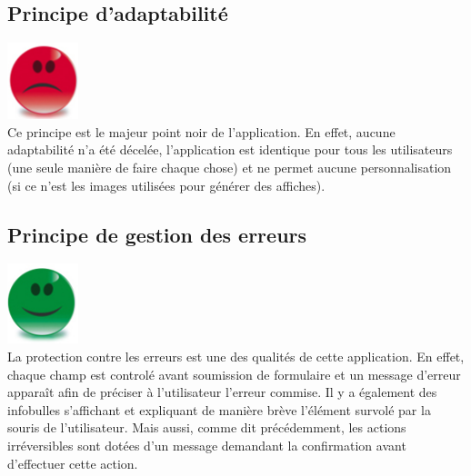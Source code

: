 \documentclass{article}
\begin{document}
\begin{sffamily}
\subsection{Principe d'adaptabilité}

\includegraphics[scale=0.365]{bad.png}\\

Ce principe est le majeur point noir de l'application. En effet, aucune adaptabilité n'a été décelée, l'application est identique pour 
tous les utilisateurs (une seule manière de faire chaque chose) et ne permet aucune personnalisation (si ce n'est les images utilisées pour générer des affiches).

\subsection{Principe de gestion des erreurs}

\includegraphics[scale=0.27]{good.png} \\

La protection contre les erreurs est une des qualités de cette application. En effet, chaque champ est controlé avant soumission de formulaire et 
un message d'erreur apparaît afin de préciser à l'utilisateur l'erreur commise. Il y a également des infobulles s'affichant et expliquant de 
manière brève l'élément survolé par la souris de l'utilisateur. Mais aussi, comme dit précédemment, les actions irréversibles sont dotées d'un 
message demandant la confirmation avant d'effectuer cette action.


\end{sffamily}
\end{document}
